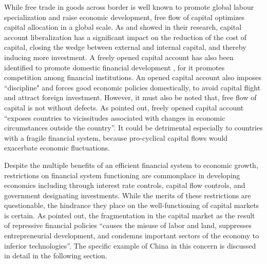 \documentclass[AER]{AEA}
\begin{document}

While free trade in goods across border is well known to promote global labour 
specialization and raise economic development, free flow of capital optimizes 
capital allocation in a global scale. As \cite{bekaert2001} and \cite{henry2000} 
showed in their research, capital account liberalization has a significant 
impact on the reduction of the cost of capital, closing the wedge between 
external and internal capital, and thereby inducing more investment. 
A freely opened capital account has also been identified to promote 
domestic financial development \citep{love2003}, for it promotes competition 
among financial institutions. 
An opened capital account also imposes ``discipline" and forces good economic 
policies domestically, to avoid capital flight and attract foreign investment.
However, it must also be noted that, free flow of capital is not without 
defects. As \cite{stiglitz2000} pointed out, freely opened capital account 
``exposes countries to vicissitudes associated with changes in economic 
circumstances outside the country''. It could be detrimental especially to 
countries with a fragile financial system, because pro-cyclical capital 
flows would exacerbate economic fluctuations. 

Despite the multiple benefits of an efficient financial system to economic growth, 
restrictions on financial system functioning are commonplace in developing 
economics including through interest rate controls, capital flow controls,  
and government designating investments.
While the merits of these restrictions are questionable, 
the hindrance they place on the well-functioning of capital markets is certain. 
As \cite{mckinnon1973} pointed out, the fragmentation in the capital market 
as the result of repressive financial policies ``causes the misuse of 
labor and land, suppresses entrepreneurial development, and condemns 
important sectors of the economy to inferior technologies''. 
The specific example of China in this concern is discussed in detail 
in the following section.\\
\end{document}
